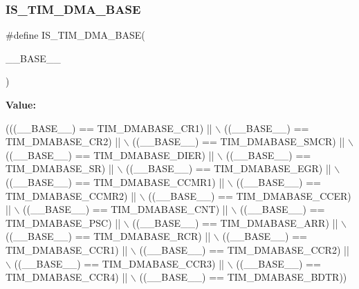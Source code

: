 \subsubsection{\texorpdfstring{I\+S\+\_\+\+T\+I\+M\+\_\+\+D\+M\+A\+\_\+\+B\+A\+SE}{IS\_TIM\_DMA\_BASE}}
{\footnotesize\ttfamily \#define I\+S\+\_\+\+T\+I\+M\+\_\+\+D\+M\+A\+\_\+\+B\+A\+SE(\begin{DoxyParamCaption}\item[{}]{\+\_\+\+\_\+\+B\+A\+S\+E\+\_\+\+\_\+ }\end{DoxyParamCaption})}

{\bfseries Value\+:}
\begin{DoxyCode}
(((\_\_BASE\_\_) == TIM\_DMABASE\_CR1)   || \(\backslash\)
                                   ((\_\_BASE\_\_) == TIM\_DMABASE\_CR2)   || \(\backslash\)
                                   ((\_\_BASE\_\_) == TIM\_DMABASE\_SMCR)  || \(\backslash\)
                                   ((\_\_BASE\_\_) == TIM\_DMABASE\_DIER)  || \(\backslash\)
                                   ((\_\_BASE\_\_) == TIM\_DMABASE\_SR)    || \(\backslash\)
                                   ((\_\_BASE\_\_) == TIM\_DMABASE\_EGR)   || \(\backslash\)
                                   ((\_\_BASE\_\_) == TIM\_DMABASE\_CCMR1) || \(\backslash\)
                                   ((\_\_BASE\_\_) == TIM\_DMABASE\_CCMR2) || \(\backslash\)
                                   ((\_\_BASE\_\_) == TIM\_DMABASE\_CCER)  || \(\backslash\)
                                   ((\_\_BASE\_\_) == TIM\_DMABASE\_CNT)   || \(\backslash\)
                                   ((\_\_BASE\_\_) == TIM\_DMABASE\_PSC)   || \(\backslash\)
                                   ((\_\_BASE\_\_) == TIM\_DMABASE\_ARR)   || \(\backslash\)
                                   ((\_\_BASE\_\_) == TIM\_DMABASE\_RCR)   || \(\backslash\)
                                   ((\_\_BASE\_\_) == TIM\_DMABASE\_CCR1)  || \(\backslash\)
                                   ((\_\_BASE\_\_) == TIM\_DMABASE\_CCR2)  || \(\backslash\)
                                   ((\_\_BASE\_\_) == TIM\_DMABASE\_CCR3)  || \(\backslash\)
                                   ((\_\_BASE\_\_) == TIM\_DMABASE\_CCR4)  || \(\backslash\)
                                   ((\_\_BASE\_\_) == TIM\_DMABASE\_BDTR))
\end{DoxyCode}
\mbox{\label{group___t_i_m___private___macros_ga58ca64223d434407d8e83ab34dd39f79}} 
